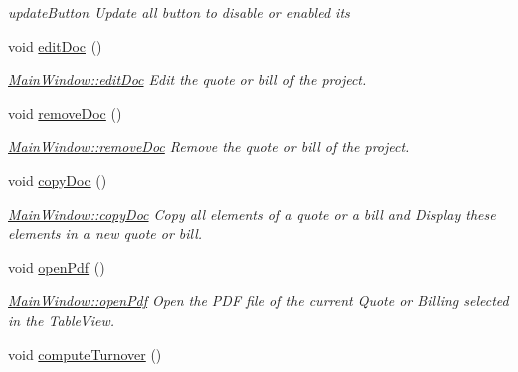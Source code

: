 \begin{DoxyCompactItemize}
\begin{DoxyCompactList}\small\item\em update\-Button Update all button to disable or enabled its \end{DoxyCompactList}\item 
\hypertarget{classGui_1_1MainWindow_a06bc679c41574cb679c6e5e7b673139c}{void \hyperlink{classGui_1_1MainWindow_a06bc679c41574cb679c6e5e7b673139c}{edit\-Doc} ()}\label{classGui_1_1MainWindow_a06bc679c41574cb679c6e5e7b673139c}

\begin{DoxyCompactList}\small\item\em \hyperlink{classGui_1_1MainWindow_a06bc679c41574cb679c6e5e7b673139c}{Main\-Window\-::edit\-Doc} Edit the quote or bill of the project. \end{DoxyCompactList}\item 
\hypertarget{classGui_1_1MainWindow_af86458ad953cb70fb7a88245a6047550}{void \hyperlink{classGui_1_1MainWindow_af86458ad953cb70fb7a88245a6047550}{remove\-Doc} ()}\label{classGui_1_1MainWindow_af86458ad953cb70fb7a88245a6047550}

\begin{DoxyCompactList}\small\item\em \hyperlink{classGui_1_1MainWindow_af86458ad953cb70fb7a88245a6047550}{Main\-Window\-::remove\-Doc} Remove the quote or bill of the project. \end{DoxyCompactList}\item 
\hypertarget{classGui_1_1MainWindow_adf1e721c73626d1810dd90c84920dcde}{void \hyperlink{classGui_1_1MainWindow_adf1e721c73626d1810dd90c84920dcde}{copy\-Doc} ()}\label{classGui_1_1MainWindow_adf1e721c73626d1810dd90c84920dcde}

\begin{DoxyCompactList}\small\item\em \hyperlink{classGui_1_1MainWindow_adf1e721c73626d1810dd90c84920dcde}{Main\-Window\-::copy\-Doc} Copy all elements of a quote or a bill and Display these elements in a new quote or bill. \end{DoxyCompactList}\item 
\hypertarget{classGui_1_1MainWindow_a6fc6c0f088d3996ad941705a13d7aaae}{void \hyperlink{classGui_1_1MainWindow_a6fc6c0f088d3996ad941705a13d7aaae}{open\-Pdf} ()}\label{classGui_1_1MainWindow_a6fc6c0f088d3996ad941705a13d7aaae}

\begin{DoxyCompactList}\small\item\em \hyperlink{classGui_1_1MainWindow_a6fc6c0f088d3996ad941705a13d7aaae}{Main\-Window\-::open\-Pdf} Open the P\-D\-F file of the current Quote or Billing selected in the Table\-View. \end{DoxyCompactList}\item 
\hypertarget{classGui_1_1MainWindow_aa4cfc2b980835fe1ccd5b869a237c05f}{void \hyperlink{classGui_1_1MainWindow_aa4cfc2b980835fe1ccd5b869a237c05f}{compute\-Turnover} ()}\label{classGui_1_1MainWindow_aa4cfc2b980835fe1ccd5b869a237c05f}


\end{DoxyCompactItemize}
